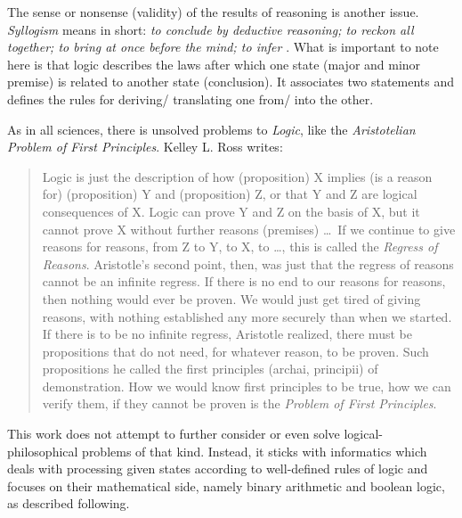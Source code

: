 The sense or nonsense (validity) of the results of reasoning is another issue.
\emph{Syllogism} means in short: \textit{to conclude by deductive reasoning; to
reckon all together; to bring at once before the mind; to infer}
\cite{websters}. What is important to note here is that logic describes the
laws after which one state (major and minor premise) is related to another
state (conclusion). It associates two statements and defines the rules for
deriving/ translating one from/ into the other.

As in all sciences, there is unsolved problems to \emph{Logic}, like the
\emph{Aristotelian Problem of First Principles}. Kelley L. Ross \cite{friesian}
writes:

\begin{quote}
    Logic is just the description of how (proposition) X implies (is a reason
    for) (proposition) Y and (proposition) Z, or that Y and Z are logical
    consequences of X. Logic can prove Y and Z on the basis of X, but it cannot
    prove X without further reasons (premises) \ldots\ If we continue to give
    reasons for reasons, from Z to Y, to X, to \ldots, this is called the
    \emph{Regress of Reasons}.
    Aristotle's second point, then, was just that the regress of reasons cannot
    be an infinite regress. If there is no end to our reasons for reasons, then
    nothing would ever be proven. We would just get tired of giving reasons,
    with nothing established any more securely than when we started. If there
    is to be no infinite regress, Aristotle realized, there must be propositions
    that do not need, for whatever reason, to be proven. Such propositions he
    called the first principles (archai, principii) of demonstration. How we
    would know first principles to be true, how we can verify them, if they
    cannot be proven is the \emph{Problem of First Principles}.
\end{quote}

This work does not attempt to further consider or even solve logical-
philosophical problems of that kind. Instead, it sticks with informatics which
deals with processing given states according to well-defined rules of logic and
focuses on their mathematical side, namely binary arithmetic and boolean logic,
as described following.
